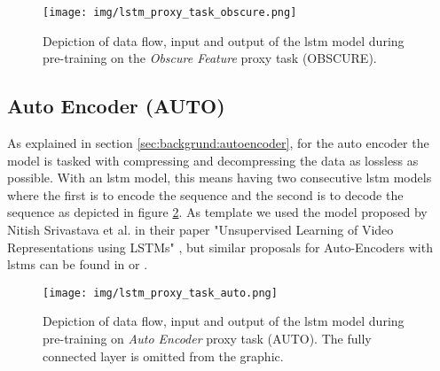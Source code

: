 \begin{figure}[h]
	\centering
	\texttt{[image: img/lstm\_proxy\_task\_obscure.png]}
	\caption{Depiction of data flow, input and output of the \gls{lstm} model during pre-training on the \textit{Obscure Feature} proxy task (OBSCURE). }
	\label{fig:experiments:lstm_proxy_task_obscure}
\end{figure}

\subsection{Auto Encoder (AUTO)} \label{sec:experiments:lstm:auto_encoder}

As explained in section \ref{sec:backgrund:autoencoder}, for the auto encoder the model is tasked with compressing and decompressing the data as lossless as possible. With an \gls{lstm} model, this means having two consecutive \gls{lstm} models where the first is to encode the sequence and the second is to decode the sequence as depicted in figure \ref{fig:experiments:lstm_proxy_task_auto}. As template we used the model proposed by Nitish Srivastava et al. in their paper "Unsupervised Learning of Video Representations using LSTMs" \cite{unsupervised_learning_lstms}, but similar proposals for Auto-Encoders with \glspl{lstm} can be found in \cite{unsupervised_learning_lstms_timeseries} or \cite{lstm_anomaly_detection}. \par

\begin{figure}[h]
	\centering
	\texttt{[image: img/lstm\_proxy\_task\_auto.png]}
	\caption{Depiction of data flow, input and output of the \gls{lstm} model during pre-training on \textit{Auto Encoder} proxy task (AUTO). The fully connected layer is omitted from the graphic. }
	\label{fig:experiments:lstm_proxy_task_auto}
\end{figure}

